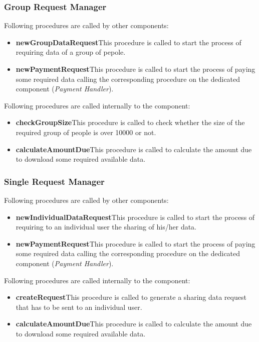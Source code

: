 \subsubsection{Group Request Manager}
Following procedures are called by other components:
\begin{itemize}
  \item \textbf{newGroupDataRequest}\quad This procedure is called to start the process of requiring data of a group of pepole.
  \item \textbf{newPaymentRequest}\quad This procedure is called to start the process of paying some required data calling the corresponding procedure on the dedicated component (\textit{Payment Handler}).
\end{itemize}

\myparagraph{}
Following procedures are called internally to the component:
\begin{itemize}
  \item \textbf{checkGroupSize}\quad This procedure is called to check whether the size of the required group of people is over 10000 or not.
  \item \textbf{calculateAmountDue}\quad This procedure is called to calculate the amount due to download some required available data.
\end{itemize}

\subsubsection{Single Request Manager}
Following procedures are called by other components:
\begin{itemize}
  \item \textbf{newIndividualDataRequest}\quad This procedure is called to start the process of requiring to an individual user the sharing of his/her data.
  \item \textbf{newPaymentRequest}\quad This procedure is called to start the process of paying some required data calling the corresponding procedure on the dedicated component (\textit{Payment Handler}).
\end{itemize}

\myparagraph{}
Following procedures are called internally to the component:
\begin{itemize}
  \item \textbf{createRequest}\quad This procedure is called to generate a sharing data request that has to be sent to an individual user.
  \item \textbf{calculateAmountDue}\quad This procedure is called to calculate the amount due to download some required available data.
\end{itemize}

